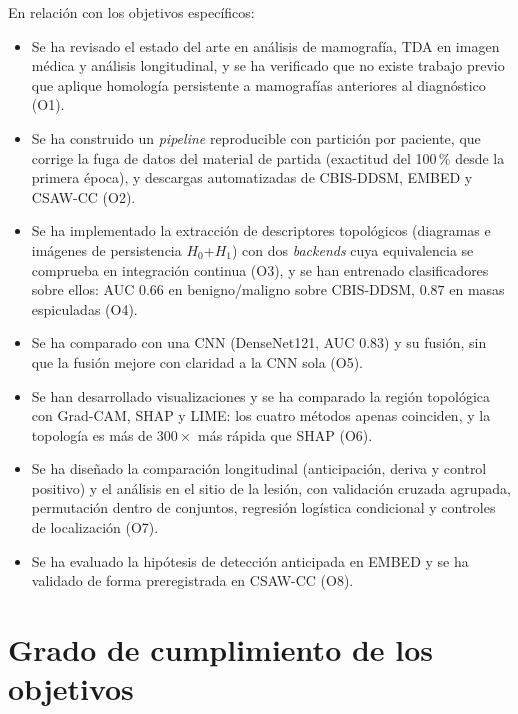 En relación con los objetivos específicos:
\begin{itemize}
  \item Se ha revisado el estado del arte en análisis de mamografía, TDA en
        imagen médica y análisis longitudinal, y se ha verificado que no
        existe trabajo previo que aplique homología persistente a
        mamografías anteriores al diagnóstico (O1).
  \item Se ha construido un \textit{pipeline} reproducible con partición
        por paciente, que corrige la fuga de datos del material de partida
        (exactitud del 100\,\% desde la primera época), y descargas
        automatizadas de CBIS-DDSM, EMBED y CSAW-CC (O2).
  \item Se ha implementado la extracción de descriptores topológicos
        (diagramas e imágenes de persistencia $H_0$+$H_1$) con dos
        \textit{backends} cuya equivalencia se comprueba en integración
        continua (O3), y se han entrenado clasificadores sobre ellos:
        AUC $0.66$ en benigno/maligno sobre CBIS-DDSM, $0.87$ en masas
        espiculadas (O4).
  \item Se ha comparado con una CNN (DenseNet121, AUC $0.83$) y su fusión,
        sin que la fusión mejore con claridad a la CNN sola (O5).
  \item Se han desarrollado visualizaciones y se ha comparado la región
        topológica con Grad-CAM, SHAP y LIME: los cuatro métodos apenas
        coinciden, y la topología es más de $300\times$ más rápida que SHAP
        (O6).
  \item Se ha diseñado la comparación longitudinal (anticipación, deriva y
        control positivo) y el análisis en el sitio de la lesión, con
        validación cruzada agrupada, permutación dentro de conjuntos,
        regresión logística condicional y controles de localización (O7).
  \item Se ha evaluado la hipótesis de detección anticipada en EMBED y se
        ha validado de forma preregistrada en CSAW-CC (O8).
\end{itemize}

\section{Grado de cumplimiento de los objetivos}

